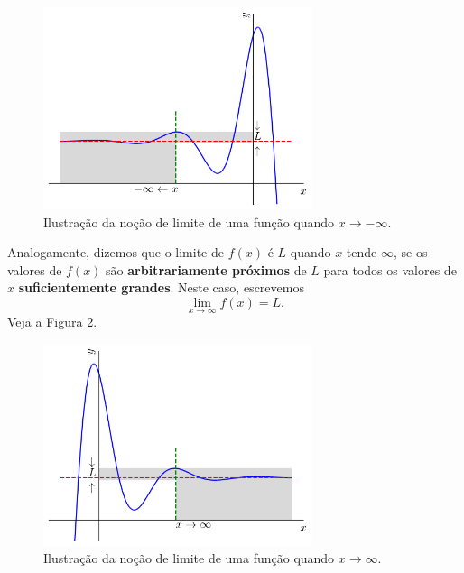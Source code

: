 \begin{figure}[H]
  \centering
  \includegraphics[width=0.7\textwidth]{./cap_lim/dados/fig_lim_x-infty/fig_lim_x-infty}
  \caption{Ilustração da noção de limite de uma função quando $x\to -\infty$.}
  \label{fig:lim_x-infty}
\end{figure}

Analogamente, dizemos que o limite de $f(x)$ é $L$ quando $x$ tende $\infty$, se os valores de $f(x)$ são {\bf arbitrariamente próximos} de $L$ para todos os valores de $x$ {\bf suficientemente grandes}. Neste caso, escrevemos
\begin{equation}
  \lim_{x\to \infty} f(x) = L.
\end{equation}
Veja a Figura \ref{fig:lim_x2infty}.

\begin{figure}[H]
  \centering
  \includegraphics[width=0.7\textwidth]{./cap_lim/dados/fig_lim_x2infty/fig_lim_x2infty}
  \caption{Ilustração da noção de limite de uma função quando $x\to \infty$.}
  \label{fig:lim_x2infty}
\end{figure}


